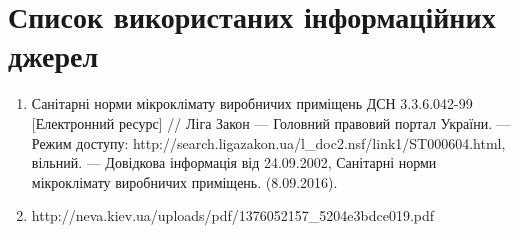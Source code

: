 \chapter*{Список використаних інформаційних джерел}
\begin{enumerate}
\item Санітарні норми мікроклімату виробничих приміщень ДСН 3.3.6.042-99 [Електронний ресурс] //
  Ліга Закон --- Головний правовий портал України. --- Режим доступу:
  http://search.ligazakon.ua/l_doc2.nsf/link1/ST000604.html, вільний. --- Довідкова інформація від
  24.09.2002, Санітарні норми мікроклімату виробничих приміщень. (8.09.2016).
\item http://neva.kiev.ua/uploads/pdf/1376052157_5204e3bdce019.pdf
\end{enumerate}